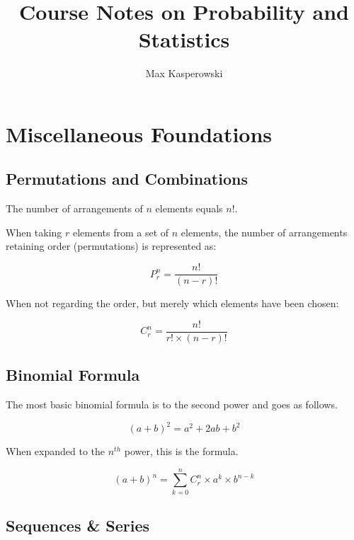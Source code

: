\documentclass[a4paper, 10pt]{article}
\author{Max Kasperowski}
\title{Course Notes on Probability and Statistics}
\begin{document}
	\maketitle
	\tableofcontents
	\newpage

	\section{Miscellaneous Foundations}

	\subsection{Permutations and Combinations}

	The number of arrangements of \(n\) elements equals \(n!\).

	\noindent When taking \(r\) elements from a set of \(n\) elements, the number of arrangements retaining order (permutations) is represented as:

	\begin{equation*}
	P^{n}_{r}=\frac{n!}{(n-r)!}
	\end{equation*}

	\noindent When not regarding the order, but merely which elements have been chosen:

	\begin{equation*}
	C^{n}_{r}=\frac{n!}{r!\times (n-r)!}
	\end{equation*}

	\subsection{Binomial Formula}

	The most basic binomial formula is to the second power and goes as follows.

	\begin{equation*}
		(a+b)^2 = a^2+2ab+b^2
	\end{equation*}

	\noindent When expanded to the \(n^{th}\) power, this is the formula.

	\begin{equation*}
		(a+b)^n = \sum_{k=0}^{n}C^{n}_{r}\times a^k\times b^{n-k}
	\end{equation*}

	\subsection{Sequences \& Series}
\end{document}
